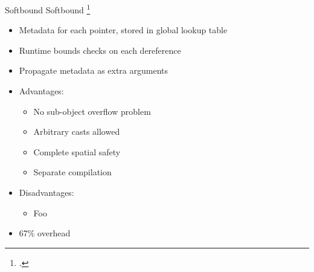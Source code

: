 \documentclass[aspectratio=169]{beamer}
\begin{document}
\begin{frame}{Softbound}
\footnotesize
Softbound \footcite{nagarakatte_softbound:_2009}
    \begin{itemize}
        \item Metadata for each pointer, stored in global lookup table 
        \item Runtime bounds checks on each dereference
        \item Propagate metadata as extra arguments 
        \item Advantages:
            \begin{itemize}
                \item No sub-object overflow problem 
                \item Arbitrary casts allowed 
                \item Complete spatial safety
                \item Separate compilation
            \end{itemize}
        \item Disadvantages:
            \begin{itemize}
                \item Foo
            \end{itemize}
        \item 67\% overhead
    \end{itemize}
\end{frame}
\end{document}

